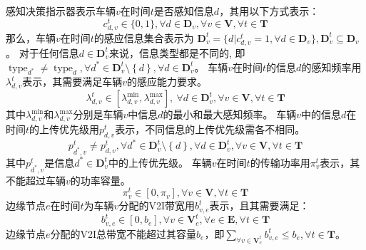 感知决策指示器表示车辆$v$在时间$t$是否感知信息$d$，其用以下方式表示：
\begin{equation}
	c_{d, v}^t \in \{0, 1\}, \forall d \in \mathbf{D}_{v}, \forall v \in \mathbf{V}, \forall t \in \mathbf{T}
	\label{equ 4-1} 
\end{equation}
那么，车辆$v$在时间$t$的感应信息集合表示为 $\mathbf{D}_v^t = \{ d | c_{d, v}^{t} = 1, \forall d \in \mathbf{D}_v \}, \mathbf{D}_v^t \subseteq \mathbf{D}_v$。
对于任何信息$d \in \mathbf{D}_v^t$来说，信息类型都是不同的, 即$\operatorname{type}_{d^*} \neq \operatorname{type}_{d}, \forall d^* \in \mathbf{D}_v^t \setminus \left\{ d\right \}, \forall d \in \mathbf{D}_v^t$。
车辆$v$在时间$t$的信息$d$的感知频率用$\lambda_{d, v}^t$表示，其需要满足车辆$v$的感应能力要求。
\begin{equation}
	\lambda_{d, v}^{t} \in [\lambda_{d, v}^{\min} , \lambda_{d, v}^{\max} ], \ \forall d \in \mathbf{D}_v^t, \forall v \in \mathbf{V}, \forall t \in \mathbf{T}
\end{equation}
其中$\lambda_{d, v}^{\min}$和$\lambda_{d, v}^{\max}$分别是车辆$v$中信息${d}$的最小和最大感知频率。
车辆$v$中的信息$d$在时间$t$的上传优先级用$p_{d, v}^t$表示，不同信息的上传优先级需各不相同。
\begin{equation}
	{p}_{d^*, v}^t \neq {p}_{d, v}^t, \forall d^* \in \mathbf{D}_v^t \setminus \left\{ d\right \}, \forall d \in \mathbf{D}_v^t, \forall v \in \mathbf{V}, \forall t \in \mathbf{T}
\end{equation}
其中${p}_{d^*, v}^t$是信息$d^* \in \mathbf{D}_v^t$中的上传优先级。
车辆$v$在时间$t$的传输功率用$\pi_{v}^t$表示，其不能超过车辆$v$的功率容量。
\begin{equation}
	\pi_v^t \in \left[ 0 , \pi_v \right ], \forall v \in \mathbf{V}, \forall t \in \mathbf{T}
\end{equation}
边缘节点$e$在时间$t$为车辆$v$分配的V2I带宽用$b_{v, e}^t$表示，且其需要满足：
\begin{equation}
	b_{v, e}^t \in \left [0, b_e \right], \forall v \in \mathbf{V}_e^{t}, \forall e \in \mathbf{E}, \forall t \in \mathbf{T}
	\label{equ 4-5} 
\end{equation}
边缘节点$e$分配的V2I总带宽不能超过其容量$b_e$，即${\sum_{\forall v \in \mathbf{V}_e^{t}} b_{v, e}^t} \leq b_e, \forall t \in \mathbf{T}$。

